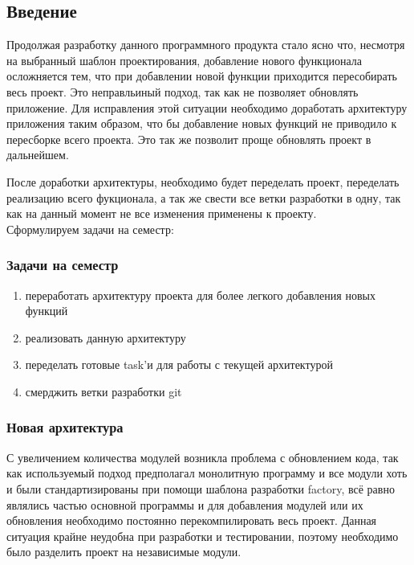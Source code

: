 \subsection{Введение}

Продолжая разработку данного программного продукта стало ясно что, несмотря на выбранный шаблон проектирования, добавление нового функционала осложняется тем, что при добавлении новой функции приходится пересобирать весь проект. Это неправльиный подход, так как не позволяет обновлять приложение. Для исправления этой ситуации необходимо доработать архитектуру приложения таким образом, что бы добавление новых функций не приводило к пересборке всего проекта. Это так же позволит проще обновлять проект в дальнейшем. 

После доработки архитектуры, необходимо будет переделать проект, переделать реализацию всего фукционала, а так же свести все ветки разработки в одну, так как на данный момент не все изменения применены к проекту. \\
Сформулируем задачи на семестр:

\subsubsection{Задачи на семестр}

\begin{enumerate}
\item переработать архитектуру проекта для более легкого добавления новых функций
\item реализовать данную архитектуру
\item переделать готовые task'и для работы с текущей архитектурой
\item смерджить ветки разработки git
\end{enumerate}

\subsubsection{Новая архитектура}

С увеличением количества модулей возникла проблема с обновлением кода, так как используемый подход предполагал монолитную программу и все модули хоть и были стандартизированы при помощи шаблона разработки factory, всё равно являлись частью основной программы и для добавления модулей или их обновления необходимо постоянно перекомпилировать весь проект. Данная ситуация крайне неудобна при разработки и тестировании, поэтому необходимо было разделить проект на независимые модули.

